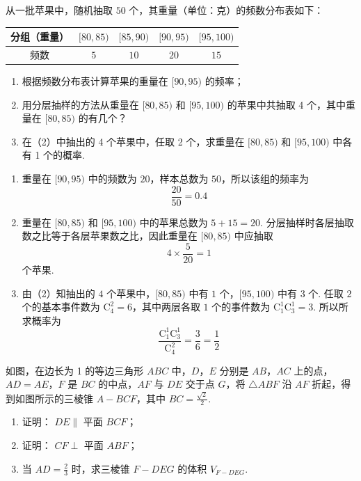 \begin{problem}
从一批苹果中，随机抽取 \(50\) 个，其重量（单位：克）的频数分布表如下：

\begin{center}
\begin{tabular}{c|cccc}
分组（重量） & \( [80,85) \) & \( [85,90) \) & \( [90,95) \) & \( [95,100) \) \\
\hline
频数 & \(5\) & \(10\) & \(20\) & \(15\)
\end{tabular}
\end{center}

\begin{enumerate}
\item 根据频数分布表计算苹果的重量在 \([90,95)\) 的频率；
\item 用分层抽样的方法从重量在 \([80,85)\) 和 \([95,100)\) 的苹果中共抽取 4 个，其中重量在 \([80,85)\) 的有几个？
\item 在（2）中抽出的 4 个苹果中，任取 2 个，求重量在 \([80,85)\) 和 \([95,100)\) 中各有 1 个的概率.
\end{enumerate}
\end{problem}

\begin{solution}
\begin{enumerate}
\item
重量在 \([90,95)\) 中的频数为 \(20\)，样本总数为 \(50\)，所以该组的频率为
\[
\frac{20}{50}=0.4
\]

\item
重量在 \([80,85)\) 和 \([95,100)\) 中的苹果总数为 \(5+15=20\). 分层抽样时各层抽取数之比等于各层苹果数之比，因此重量在 \([80,85)\) 中应抽取
\[
4\times\frac{5}{20}=1
\]
个苹果.

\item
由（2）知抽出的 \(4\) 个苹果中，\([80,85)\) 中有 \(1\) 个，\([95,100)\) 中有 \(3\) 个. 任取 \(2\) 个的基本事件数为 \(\mathrm C_4^2=6\)，其中两层各取 \(1\) 个的事件数为 \(\mathrm C_1^1\mathrm C_3^1=3\). 所以所求概率为
\[
\frac{\mathrm C_1^1\mathrm C_3^1}{\mathrm C_4^2}=\frac{3}{6}=\frac12
\]
\end{enumerate}
\end{solution}

\begin{problem}
如图，在边长为 1 的等边三角形 \(ABC\) 中，\(D\)，\(E\) 分别是 \(AB\)，\(AC\) 上的点，\(AD = AE\)，\(F\) 是 \(BC\) 的中点，\(AF\) 与 \(DE\) 交于点 \(G\)，将 \(\triangle ABF\) 沿 \(AF\) 折起，得到如图所示的三棱锥 \(A - BCF\)，其中 \(BC = \frac{\sqrt{2}}{2}\).
\begin{enumerate}
\item 证明： \(DE \parallel\) 平面 \(BCF\)；
\item 证明： \(CF \perp\) 平面 \(ABF\)；
\item 当 \(AD = \frac{2}{3}\) 时，求三棱锥 \(F - DEG\) 的体积 \(V_{F - DEG}\).
\end{enumerate}

\end{problem}

